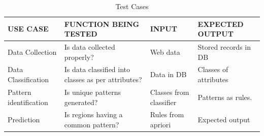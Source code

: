\begin{table}[ht]
\caption{Test Cases}
\begin{tabular}{ |M{4cm}|p{5cm}|M{2.5cm}|M{3.2cm}|  }
 \hline
 \textbf{USE CASE} & \textbf{FUNCTION BEING TESTED} & \textbf{INPUT} & \textbf{EXPECTED OUTPUT}\\
 \hline
 
Data Collection & Is data collected properly? & Web data & Stored records in DB\\

\hline
 Data Classification & Is data classified into  classes as per attributes? & Data in DB & Classes of attributes\\
 
 \hline
 Pattern identification & Is unique patterns generated? & Classes from classifier & Patterns as rules.\\
 
 \hline
 Prediction & Is regions having a common pattern? & Rules from apriori & Expected output\\
  
  \hline
  
 
 \end{tabular}
 
\end{table}

